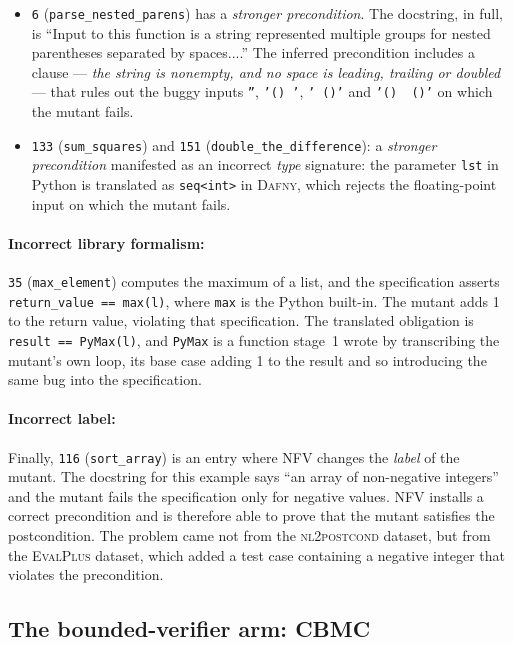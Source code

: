 \documentclass[11pt,letterpaper]{article}
\newcommand{\daf}{\textsc{Dafny}}
\begin{document}
\begin{itemize}
\item \texttt{6} (\texttt{parse\_nested\_parens}) has a \emph{stronger precondition}. 
The docstring, in full, is ``Input to this function is a
  string represented multiple groups for nested parentheses separated by
  spaces....'' The inferred precondition includes a clause --- \emph{the string is nonempty, and no space is leading, trailing
  or doubled} --- that rules out the buggy inputs \texttt{''}, \texttt{'()~'},
  \texttt{'~()'} and \texttt{'()~~()'} on which the mutant fails.
\item \texttt{133} (\texttt{sum\_squares}) and \texttt{151} (\texttt{double\_the\_difference}): a \emph{stronger precondition} manifested as an incorrect \emph{type} signature:
  the parameter \texttt{lst} in Python is translated as \texttt{seq<int>} in \daf{}, which rejects the floating-point input 
  on which the mutant fails.
\end{itemize}

\paragraph{Incorrect library formalism:} \label{sec:unsound}\texttt{35} (\texttt{max\_element}) 
computes the maximum of a list, and the specification asserts
\texttt{return\_value == max(l)}, where \texttt{max} is the Python built-in.
The mutant adds 1 to the return value, violating that specification. 
The translated obligation is \texttt{result == PyMax(l)}, and \texttt{PyMax} is a
function stage~1 wrote by transcribing the mutant's own loop, its base case adding 
1 to the result and so introducing the same bug into the specification. 

\paragraph{Incorrect label:}
Finally, \texttt{116} (\texttt{sort\_array}) is an entry where NFV changes the \emph{label} of the mutant.
The docstring for this example says ``an array of non-negative
integers'' and the mutant fails the specification only for negative
values. 
NFV installs a correct precondition and is therefore able to prove that the mutant satisfies the postcondition. 
The problem came not from the \textsc{nl2postcond} dataset, but from the \textsc{EvalPlus} dataset, which added a test case containing a negative integer that violates the precondition. 

\subsection{The bounded-verifier arm: \textsc{CBMC}}
\label{sec:evalcbmc}
\end{document}
